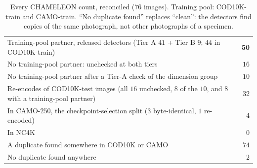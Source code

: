 \begin{table}[h]
\caption{Every CHAMELEON count, reconciled ($76$ images). Training pool: COD10K-train and CAMO-train. ``No duplicate
found'' replaces ``clean'': the detectors find copies of the same photograph, not other photographs of a specimen.}
\label{tab:chamcount}
\begin{center}
\scriptsize
\setlength{\tabcolsep}{4pt}
\begin{tabular}{@{}lr@{}}
\toprule
Training-pool partner, released detectors (Tier A $41$ + Tier B $9$; $44$ in COD10K-train) & $\mathbf{50}$ \\
No training-pool partner: unchecked at both tiers & $16$ \\
No training-pool partner after a Tier-A check of the dimension group & $10$ \\
\midrule
Re-encodes of COD10K-test images (all $16$ unchecked, $8$ of the $10$, and $8$ with a training-pool partner) & $32$ \\
In CAMO-250, the checkpoint-selection split ($3$ byte-identical, $1$ re-encoded) & $4$ \\
In NC4K & $0$ \\
\midrule
A duplicate found somewhere in COD10K or CAMO & $74$ \\
No duplicate found anywhere & $2$ \\
\bottomrule
\end{tabular}
\end{center}
\end{table}
